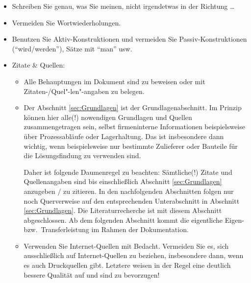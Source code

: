 \begin{itemize}
  \item
    Schreiben Sie genau, was Sie meinen, nicht irgendetwas in der Richtung \dots
  \item
    Vermeiden Sie Wortwiederholungen.
  \item
    Benutzen Sie Aktiv-Konstruktionen und vermeiden Sie
    Passiv-Konstruktionen ("`wird/werden"'), Sätze mit "`man"' usw.
  \item
    Zitate \& Quellen: 
    \begin{itemize}
      \item
        Alle Behauptungen im Dokument sind zu beweisen oder mit
        Zitaten-/Quel"-len"-angaben zu belegen. 
      \item 
        Der Abschnitt \ref{sec:Grundlagen} ist der Grundlagenabschnitt. Im Prinzip können hier alle(!) nowendigen Grundlagen und Quellen zusammengetragen sein, selbst firmeninterne Informationen beispielsweise über Prozessabläufe oder Lagerhaltung. Das ist insbesondere dann wichtig, wenn beispielsweise nur bestimmte Zulieferer oder Bauteile für die Lösungsfindung zu verwenden sind. 

Daher ist folgende Daumenregel zu beachten: Sämtliche(!) Zitate und Quellenangaben sind bis einschließlich Abschnitt \ref{sec:Grundlagen} anzugeben / zu zitieren. In den nachfolgenden Abschnitten folgen nur noch Querverweise auf den entsprechenden Unterabschnitt in Abschnitt \ref{sec:Grundlagen}. Die Literaturrecherche ist mit diesem Abschnitt abgeschlossen. 
Ab dem folgenden Abschnitt kommt die eigentliche Eigen- bzw.~Transferleistung im Rahmen der Dokumentation. 

      \item
        Verwenden Sie Internet-Quellen mit Bedacht. 
        Vermeiden Sie es, sich ausschließlich auf Internet-Quellen zu beziehen, insbesondere dann, wenn es auch Druckquellen gibt. Letztere weisen in der Regel eine deutlich bessere Qualität auf und sind zu bevorzugen! 
        

\end{itemize}
\end{itemize}
